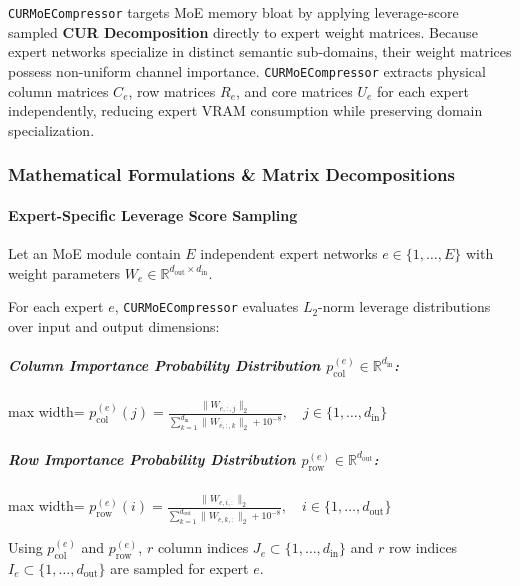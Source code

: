 \texttt{CURMoECompressor} targets MoE memory bloat by applying leverage-score sampled \textbf{CUR Decomposition} directly to expert weight matrices. Because expert networks specialize in distinct semantic sub-domains, their weight matrices possess non-uniform channel importance. \texttt{CURMoECompressor} extracts physical column matrices $C_e$, row matrices $R_e$, and core matrices $U_e$ for each expert independently, reducing expert VRAM consumption while preserving domain specialization.


\subsubsection*{Mathematical Formulations \& Matrix Decompositions}

\paragraph{Expert-Specific Leverage Score Sampling}
Let an MoE module contain $E$ independent expert networks $e \in \{1, \dots, E\}$ with weight parameters $W_e \in \mathbb{R}^{d_{\text{out}} \times d_{\text{in}}}$.

For each expert $e$, \texttt{CURMoECompressor} evaluates $L_2$-norm leverage distributions over input and output dimensions:

\subparagraph{Column Importance Probability Distribution $p_{\text{col}}^{(e)} \in \mathbb{R}^{d_{\text{in}}}$:}
\begin{center}
\begin{adjustbox}{max width=\columnwidth}
$\displaystyle
p_{\text{col}}^{(e)}(j) = \frac{\|W_{e, :, j}\|_2}{\sum_{k=1}^{d_{\text{in}}} \|W_{e, :, k}\|_2 + 10^{-8}}, \quad j \in \{1, \dots, d_{\text{in}}\}
$
\end{adjustbox}
\end{center}

\subparagraph{Row Importance Probability Distribution $p_{\text{row}}^{(e)} \in \mathbb{R}^{d_{\text{out}}}$:}
\begin{center}
\begin{adjustbox}{max width=\columnwidth}
$\displaystyle
p_{\text{row}}^{(e)}(i) = \frac{\|W_{e, i, :}\|_2}{\sum_{k=1}^{d_{\text{out}}} \|W_{e, k, :}\|_2 + 10^{-8}}, \quad i \in \{1, \dots, d_{\text{out}}\}
$
\end{adjustbox}
\end{center}

Using $p_{\text{col}}^{(e)}$ and $p_{\text{row}}^{(e)}$, $r$ column indices $J_e \subset \{1, \dots, d_{\text{in}}\}$ and $r$ row indices $I_e \subset \{1, \dots, d_{\text{out}}\}$ are sampled for expert $e$.


